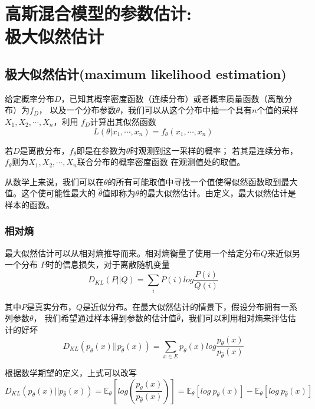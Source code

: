 \chapter{高斯混合模型的参数估计:\\极大似然估计}


\section{极大似然估计(maximum likelihood estimation)}

给定概率分布$D$，已知其概率密度函数（连续分布）或者概率质量函数（离散分布）为$f_D$，
以及一个分布参数$\theta$，我们可以从这个分布中抽一个具有$n$个值的采样$X_1,X_2,\cdots,X_n$，利用
$f_D$计算出其似然函数
\begin{equation}
    L(\theta|x_1,\cdots,x_n)=f_\theta(x_1,\cdots,x_n)
\end{equation}

若$D$是离散分布，$f_\theta$即是在参数为$\theta$时观测到这一采样的概率；
若其是连续分布，$f_\theta$则为$X_1,X_2,\cdots,X_n$联合分布的概率密度函数
在观测值处的取值。

从数学上来说，我们可以在$\displaystyle \theta$的所有可能取值中寻找一个值使得似然函数取到最大值。这个使可能性最大的
$\displaystyle {\widehat {\theta }}$值即称为$\displaystyle \theta$的最大似然估计。由定义，最大似然估计是样本的函数。

\subsection*{相对熵}

最大似然估计可以从相对熵推导而来。相对熵衡量了使用一个给定分布$Q$来近似另一个分布
$P$时的信息损失，对于离散随机变量
\begin{equation}
    D_{KL}(P||Q)=\sum_{i}P(i)log\frac{P(i)}{Q(i)}
\end{equation}

其中$P$是真实分布，$Q$是近似分布。在最大似然估计的情景下，假设分布拥有一系列参数$\theta$，
我们希望通过样本得到参数的估计值$\hat{\theta}$，我们可以利用相对熵来评估估计的好坏
\begin{equation}
    D_{KL}(p_\theta(x)||p_{\hat{\theta}}(x))=\sum_{x\in E}p_\theta(x)log \frac{p_\theta(x)}{p_{\hat{\theta}}(x)}
\end{equation}

根据数学期望的定义，上式可以改写
\begin{equation}
    D_{KL}(p_\theta(x)||p_{\hat{\theta}}(x))=\mathbb{E}_\theta[log(\frac{p_\theta(x)}{p_{\hat{\theta}}(x)})]
    =\mathbb{E}_\theta[log\ p_\theta(x)]-\mathbb{E}_\theta[log\ p_{\hat{\theta}}(x)]
\end{equation}


